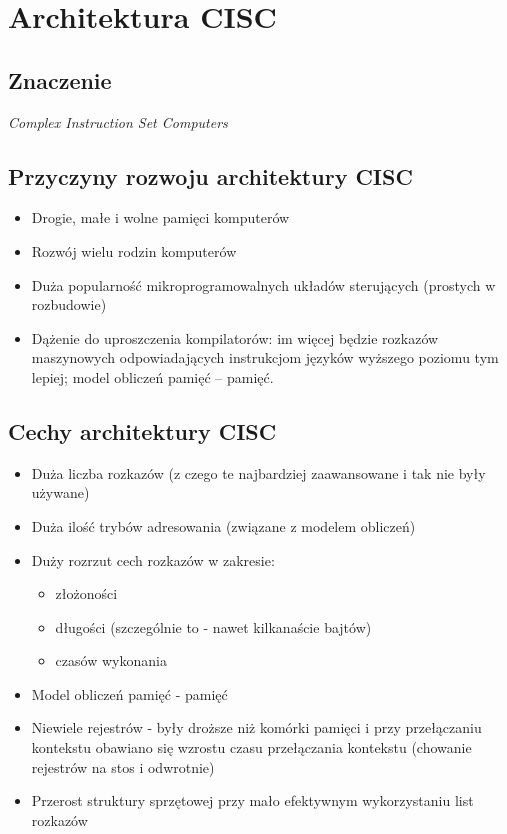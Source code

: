 \section{Architektura CISC}
	\subsection{Znaczenie} \noindent
		\emph{Complex Instruction Set Computers}
	
	\subsection{Przyczyny rozwoju architektury CISC}
    	\begin{itemize}
	        \item Drogie, małe i wolne pamięci komputerów
	        \item Rozwój wielu rodzin komputerów
	        \item Duża popularność mikroprogramowalnych układów sterujących (prostych w rozbudowie)
	        \item Dążenie do uproszczenia kompilatorów: im więcej będzie rozkazów maszynowych odpowiadających instrukcjom języków wyższego poziomu tym lepiej; model obliczeń pamięć – pamięć.
        \end{itemize}
    
    \subsection{Cechy architektury CISC}
    	\begin{itemize}
	        \item Duża liczba rozkazów (z czego te najbardziej zaawansowane i tak nie były używane)
	        \item Duża ilość trybów adresowania (związane z modelem obliczeń)
	        \item Duży rozrzut cech rozkazów w zakresie:
	        \begin{itemize}
		        \item złożoności
		        \item długości (szczególnie to - nawet kilkanaście bajtów)
		        \item czasów wykonania
	        \end{itemize}
	        \item Model obliczeń pamięć - pamięć
	        \item Niewiele rejestrów - były droższe niż komórki pamięci i przy przełączaniu kontekstu obawiano się wzrostu czasu przełączania kontekstu (chowanie rejestrów na stos i odwrotnie)
	        \item Przerost struktury sprzętowej przy mało efektywnym wykorzystaniu list rozkazów
        \end{itemize}
   
